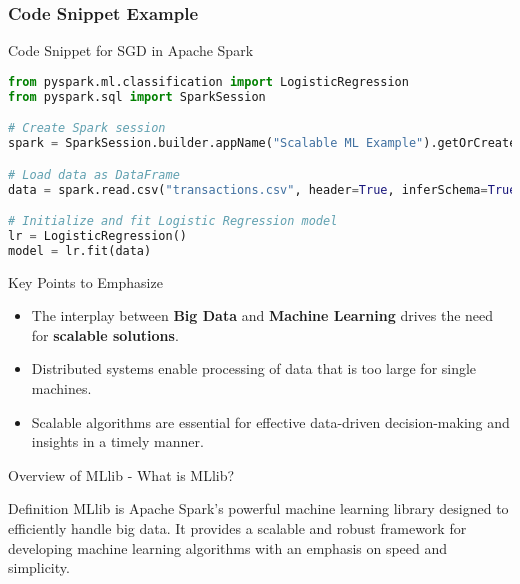 \documentclass[aspectratio=169]{beamer}
\begin{document}
\begin{frame}[fragile]
    \frametitle{Code Snippet Example}
    \begin{block}{Code Snippet for SGD in Apache Spark}
        \begin{lstlisting}[language=Python]
from pyspark.ml.classification import LogisticRegression
from pyspark.sql import SparkSession

# Create Spark session
spark = SparkSession.builder.appName("Scalable ML Example").getOrCreate()

# Load data as DataFrame
data = spark.read.csv("transactions.csv", header=True, inferSchema=True)

# Initialize and fit Logistic Regression model
lr = LogisticRegression()
model = lr.fit(data)
        \end{lstlisting}
    \end{block}
    
    \begin{block}{Key Points to Emphasize}
        \begin{itemize}
            \item The interplay between \textbf{Big Data} and \textbf{Machine Learning} drives the need for \textbf{scalable solutions}.
            \item Distributed systems enable processing of data that is too large for single machines.
            \item Scalable algorithms are essential for effective data-driven decision-making and insights in a timely manner.
        \end{itemize}
    \end{block}
\end{frame}

\begin{frame}[fragile]{Overview of MLlib - What is MLlib?}
    \begin{block}{Definition}
        MLlib is Apache Spark's powerful machine learning library designed to efficiently handle big data. 
        It provides a scalable and robust framework for developing machine learning algorithms with an emphasis on speed and simplicity.
    \end{block}
\end{frame}
\end{document}
